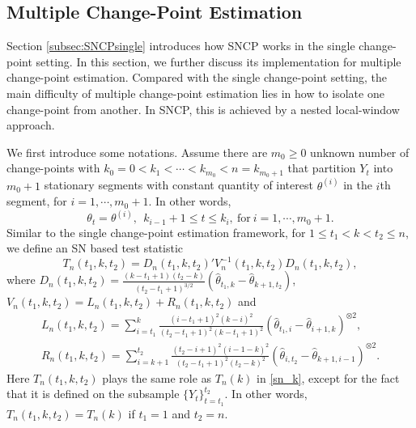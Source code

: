 \subsection{Multiple Change-Point Estimation}\label{subsec:SNCPmultiple}	

Section \ref{subsec:SNCPsingle} introduces how SNCP works in the single change-point setting. In this section, we further discuss its implementation for multiple change-point estimation. Compared with the single change-point setting, the main difficulty of multiple change-point estimation lies in how to isolate one change-point from another. In SNCP, this is achieved by a nested local-window approach. 

We first introduce some notations. Assume there are $m_0 \geq 0$ unknown number of change-points with $k_0=0<k_1<\cdots<k_{m_0}<n=k_{m_0+1}$ that partition $Y_t$ into $m_0+1$ stationary segments with constant quantity of interest $\theta^{(i)}$ in the $i$th segment, for $i=1,\cdots,m_0+1$.  In other words,
\begin{equation*}
	\theta_t = \theta^{(i)},~~ k_{i-1}+1 \leq t \leq k_i, ~\text{for}~ i = 1,\cdots,m_0+1.
\end{equation*}
Similar to the single change-point estimation framework, for $1 \leq t_1 < k < t_2 \leq n$, we define an SN based test statistic
\begin{equation}\label{eq:Tnt1kt2}
	T_n(t_1,k,t_2)=D_n(t_1,k,t_2)'V_n^{-1}(t_1,k,t_2)D_n(t_1,k,t_2), 
\end{equation}
where $D_n(t_1,k,t_2) = \frac{(k-t_1+1)(t_2-k)}{(t_2-t_1+1)^{3/2}}(\hat{\theta}_{t_1,k}-\hat{\theta}_{k+1,t_2})$, $V_n(t_1,k,t_2) = L_n(t_1,k,t_2) + R_n(t_1,k,t_2)$ and
\begin{eqnarray*}
	L_n(t_1,k,t_2) = \sum_{i=t_1}^{k} \frac{(i-t_1+1)^2(k-i)^2}{(t_2-t_1+1)^2(k-t_1+1)^2}(\hat{\theta}_{t_1,i}-\hat{\theta}_{i+1,k})^{\otimes 2},   \\
	R_n(t_1,k,t_2) = \sum_{i=k+1}^{t_2} \frac{(t_2-i+1)^2(i-1-k)^2}{(t_2-t_1+1)^2(t_2-k)^2}(\hat{\theta}_{i,t_2}-\hat{\theta}_{k+1,i-1})^{\otimes 2}.
\end{eqnarray*}
Here $T_n(t_1,k,t_2)$ plays the same role as $T_n(k)$ in \eqref{sn_k}, except for the fact that it is defined on the subsample $\{Y_t\}_{t=t_1}^{t_2}$. In other words, $T_n(t_1,k,t_2)=T_n(k)$ if $t_1=1$ and $t_2=n$. 

